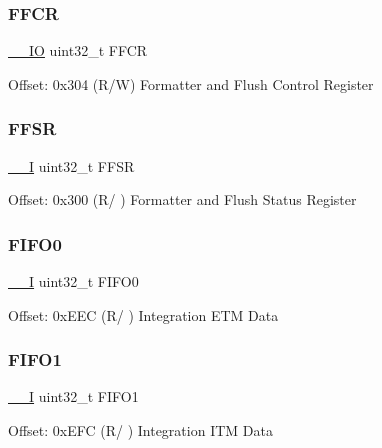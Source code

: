 \subsubsection{\texorpdfstring{FFCR}{FFCR}}
{\footnotesize\ttfamily \mbox{\hyperlink{core__sc300_8h_aec43007d9998a0a0e01faede4133d6be}{\+\_\+\+\_\+\+IO}} uint32\+\_\+t F\+F\+CR}

Offset\+: 0x304 (R/W) Formatter and Flush Control Register \mbox{\label{struct_t_p_i___type_ab1bcdedfb12eaebecde53a7add7f9f84}} 
\subsubsection{\texorpdfstring{FFSR}{FFSR}}
{\footnotesize\ttfamily \mbox{\hyperlink{core__sc300_8h_af63697ed9952cc71e1225efe205f6cd3}{\+\_\+\+\_\+I}} uint32\+\_\+t F\+F\+SR}

Offset\+: 0x300 (R/ ) Formatter and Flush Status Register \mbox{\label{struct_t_p_i___type_afaaebd439123255be4d82536f8bda272}} 
\subsubsection{\texorpdfstring{FIFO0}{FIFO0}}
{\footnotesize\ttfamily \mbox{\hyperlink{core__sc300_8h_af63697ed9952cc71e1225efe205f6cd3}{\+\_\+\+\_\+I}} uint32\+\_\+t F\+I\+F\+O0}

Offset\+: 0x\+E\+EC (R/ ) Integration E\+TM Data \mbox{\label{struct_t_p_i___type_af9289020546ed8dfae56b59506dfb29c}} 
\subsubsection{\texorpdfstring{FIFO1}{FIFO1}}
{\footnotesize\ttfamily \mbox{\hyperlink{core__sc300_8h_af63697ed9952cc71e1225efe205f6cd3}{\+\_\+\+\_\+I}} uint32\+\_\+t F\+I\+F\+O1}

Offset\+: 0x\+E\+FC (R/ ) Integration I\+TM Data \mbox{\label{struct_t_p_i___type_a3030960fcac362026459469bc2ff3178}} 
